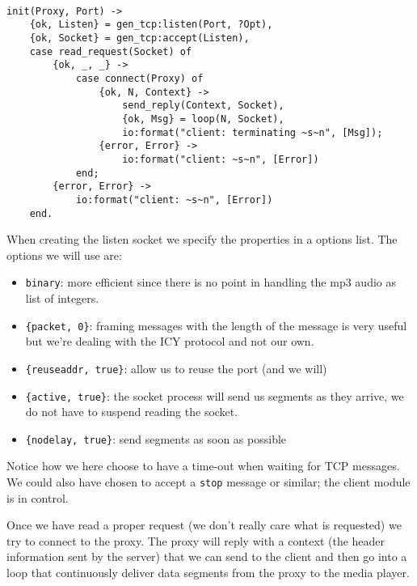 \documentclass[a4paper,11pt]{article}
\begin{document}
\begin{verbatim}

init(Proxy, Port) ->
    {ok, Listen} = gen_tcp:listen(Port, ?Opt),
    {ok, Socket} = gen_tcp:accept(Listen),
    case read_request(Socket) of
        {ok, _, _} ->
            case connect(Proxy) of
                {ok, N, Context} ->
                    send_reply(Context, Socket),
                    {ok, Msg} = loop(N, Socket),
                    io:format("client: terminating ~s~n", [Msg]);
                {error, Error} ->
                    io:format("client: ~s~n", [Error])
            end;
        {error, Error} ->
            io:format("client: ~s~n", [Error])
    end.
\end{verbatim}

When creating the listen socket we specify the properties in a options
list. The options we will use are:

\begin{itemize}

\item {\tt binary}: more efficient since there is no point in handling
  the mp3 audio as list of integers.

\item {\tt \{packet, 0\}}: framing messages with the length of the
  message is very useful but we're dealing with the ICY protocol and not our own.

\item {\tt \{reuseaddr, true\}}: allow us to reuse the port (and we will) 

\item {\tt \{active, true\}}: the socket process will send us segments
  as they arrive, we do not have to suspend reading the socket.

\item {\tt \{nodelay, true\}}: send segments as soon as possible

\end{itemize}

Notice how we here choose to have a time-out when waiting for TCP
messages. We could also have chosen to accept a {\tt stop} message or
similar; the client module is in control.

Once we have read a proper request (we don't really care what is
requested) we try to connect to the proxy. The proxy will reply with a
context (the header information sent by the server) that we can send
to the client and then go into a loop that continuously deliver data
segments from the proxy to the media player.
\end{document}
